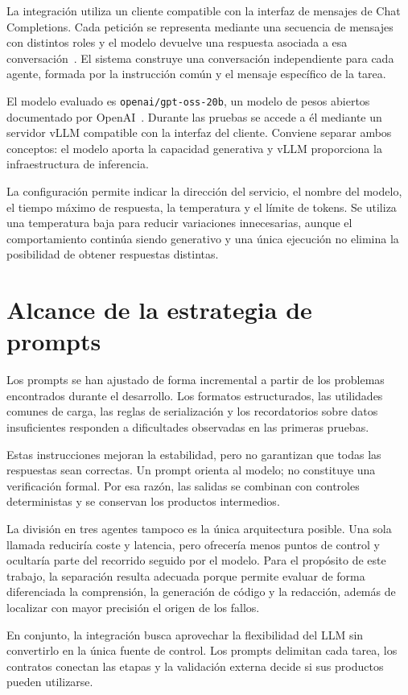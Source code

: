 La integración utiliza un cliente compatible con la interfaz de mensajes de Chat Completions. Cada petición se representa mediante una secuencia de mensajes con distintos roles y el modelo devuelve una respuesta asociada a esa conversación~\cite{openaiChatCompletionsApi}. El sistema construye una conversación independiente para cada agente, formada por la instrucción común y el mensaje específico de la tarea.

El modelo evaluado es \texttt{openai/gpt-oss-20b}, un modelo de pesos abiertos documentado por OpenAI~\cite{openai2025gptossmodelcard}. Durante las pruebas se accede a él mediante un servidor vLLM compatible con la interfaz del cliente. Conviene separar ambos conceptos: el modelo aporta la capacidad generativa y vLLM proporciona la infraestructura de inferencia.

La configuración permite indicar la dirección del servicio, el nombre del modelo, el tiempo máximo de respuesta, la temperatura y el límite de tokens. Se utiliza una temperatura baja para reducir variaciones innecesarias, aunque el comportamiento continúa siendo generativo y una única ejecución no elimina la posibilidad de obtener respuestas distintas.

\section{Alcance de la estrategia de prompts}

Los prompts se han ajustado de forma incremental a partir de los problemas encontrados durante el desarrollo. Los formatos estructurados, las utilidades comunes de carga, las reglas de serialización y los recordatorios sobre datos insuficientes responden a dificultades observadas en las primeras pruebas.

Estas instrucciones mejoran la estabilidad, pero no garantizan que todas las respuestas sean correctas. Un prompt orienta al modelo; no constituye una verificación formal. Por esa razón, las salidas se combinan con controles deterministas y se conservan los productos intermedios.

La división en tres agentes tampoco es la única arquitectura posible. Una sola llamada reduciría coste y latencia, pero ofrecería menos puntos de control y ocultaría parte del recorrido seguido por el modelo. Para el propósito de este trabajo, la separación resulta adecuada porque permite evaluar de forma diferenciada la comprensión, la generación de código y la redacción, además de localizar con mayor precisión el origen de los fallos.

En conjunto, la integración busca aprovechar la flexibilidad del LLM sin convertirlo en la única fuente de control. Los prompts delimitan cada tarea, los contratos conectan las etapas y la validación externa decide si sus productos pueden utilizarse.

